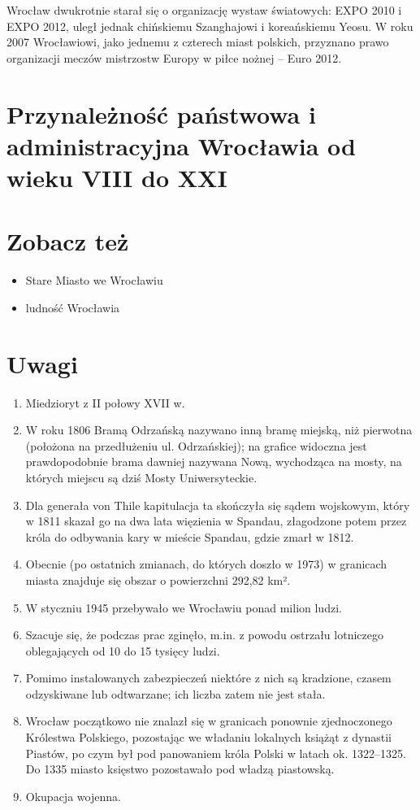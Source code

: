 \documentclass{article}
\begin{document}
Wrocław dwukrotnie starał się o organizację wystaw światowych: EXPO 2010 i EXPO 2012, uległ jednak chińskiemu Szanghajowi i koreańskiemu Yeosu. W roku 2007 Wrocławiowi, jako jednemu z czterech miast polskich, przyznano prawo organizacji meczów mistrzostw Europy w piłce nożnej – Euro 2012.

\section{Przynależność państwowa i administracyjna Wrocławia od wieku VIII do XXI}
\hrulefill

\section{Zobacz też}
\hrulefill

\begin{itemize}
    \item Stare Miasto we Wrocławiu
    \item ludność Wrocławia
\end{itemize}

\section{Uwagi}
\hrulefill

\begin{enumerate}
    \item Miedzioryt z II połowy XVII w.
    \item W roku 1806 Bramą Odrzańską nazywano inną bramę miejską, niż pierwotna (położona na przedłużeniu ul. Odrzańskiej); na grafice widoczna jest prawdopodobnie brama dawniej nazywana Nową, wychodząca na mosty, na których miejscu są dziś Mosty Uniwersyteckie.
    \item Dla generała von Thile kapitulacja ta skończyła się sądem wojskowym, który w 1811 skazał go na dwa lata więzienia w Spandau, złagodzone potem przez króla do odbywania kary w mieście Spandau, gdzie zmarł w 1812.
    \item Obecnie (po ostatnich zmianach, do których doszło w 1973) w granicach miasta znajduje się obszar o powierzchni 292,82 km².
    \item W styczniu 1945 przebywało we Wrocławiu ponad milion ludzi.
    \item Szacuje się, że podczas prac zginęło, m.in. z powodu ostrzału lotniczego oblegających od 10 do 15 tysięcy ludzi.
    \item Pomimo instalowanych zabezpieczeń niektóre z nich są kradzione, czasem odzyskiwane lub odtwarzane; ich liczba zatem nie jest stała.
    \item Wrocław początkowo nie znalazł się w granicach ponownie zjednoczonego Królestwa Polskiego, pozostając we władaniu lokalnych książąt z dynastii Piastów, po czym był pod panowaniem króla Polski w latach ok. 1322–1325. Do 1335 miasto księstwo pozostawało pod władzą piastowską.
    \item Okupacja wojenna.
\end{enumerate}
\end{document}
